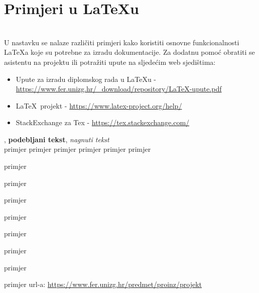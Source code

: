 		\section{Primjeri u \LaTeX u}
		
		\\

		U nastavku se nalaze različiti primjeri kako koristiti osnovne funkcionalnosti \LaTeX a koje su potrebne za izradu dokumentacije. Za dodatnu pomoć obratiti se asistentu na projektu ili potražiti upute na sljedećim web sjedištima:
		\begin{itemize}
			\item Upute za izradu diplomskog rada u \LaTeX u - \url{https://www.fer.unizg.hr/_download/repository/LaTeX-upute.pdf}
			\item \LaTeX\ projekt - \url{https://www.latex-project.org/help/}
			\item StackExchange za Tex - \url{https://tex.stackexchange.com/}\\
		
		\end{itemize} 	


		
		\noindent {}, \textbf{podebljani tekst}, 	\textit{nagnuti tekst}\\
		\noindent \normalsize primjer \large primjer \Large primjer \LARGE {primjer} \huge {primjer} \Huge primjer \normalsize
				
		\begin{packed_item}
			
			\item  primjer
			\item  primjer
			\item  primjer
			\item[] \begin{packed_enum}
				\item primjer
				\item[] \begin{packed_enum}
					\item[1.a] primjer
					\item[b] primjer
				\end{packed_enum}
				\item primjer
			\end{packed_enum}
			
		\end{packed_item}
		
		\noindent primjer url-a: \url{https://www.fer.unizg.hr/predmet/proinz/projekt}
		
